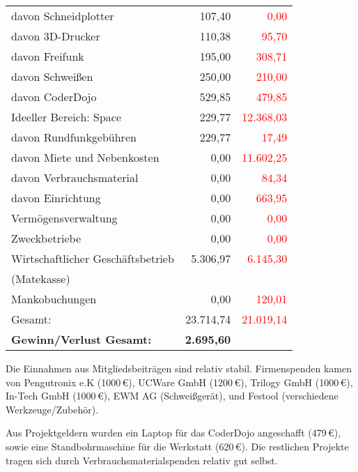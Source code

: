 \documentclass{s0minutes}
\begin{document}
\begin{longtable}{lr>{\textcolor{red}\bgroup}r<{\egroup}}
  \quad davon Schneidplotter        &      107{,}40 &         0{,}00 \\
  \quad davon 3D-Drucker            &      110{,}38 &        95{,}70 \\
  \quad davon Freifunk              &      195{,}00 &       308{,}71 \\
  \quad davon Schweißen             &      250{,}00 &       210{,}00 \\
  \quad davon CoderDojo             &      529{,}85 &       479{,}85 \\
  \midrule
  Ideeller Bereich: Space           &      229{,}77 &  12{.}368{,}03 \\
  \quad davon Rundfunkgebühren      &      229{,}77 &        17{,}49 \\
  \quad davon Miete und Nebenkosten &        0{,}00 &  11{.}602{,}25 \\
  \quad davon Verbrauchsmaterial    &        0{,}00 &        84{,}34 \\
  \quad davon Einrichtung           &        0{,}00 &       663{,}95 \\
  \midrule
  Vermögensverwaltung               &        0{,}00 &         0{,}00 \\
  \midrule
  Zweckbetriebe                     &        0{,}00 &         0{,}00 \\
  \midrule
  Wirtschaftlicher Geschäftsbetrieb &  5{.}306{,}97 &   6{.}145{,}30 \\
  \quad (Matekasse) && \\
  \midrule
  Mankobuchungen                    &        0{,}00 &       120{,}01 \\
  \midrule\midrule
  Gesamt:                           & 23{.}714{,}74 &  21{.}019{,}14 \\

  \textbf{Gewinn/Verlust Gesamt:} & \textbf{2{.}695{,}60} &          \\
\end{longtable}

Die Einnahmen aus Mitgliedsbeiträgen sind relativ stabil.
Firmenspenden kamen von Pengutronix e.K (1000\,€), UCWare GmbH (1200\,€),
Trilogy GmbH (1000\,€), In-Tech GmbH (1000\,€), EWM AG (Schweißgerät), und 
Festool (verschiedene Werkzeuge/Zubehör).

Aus Projektgeldern wurden ein Laptop für das CoderDojo angeschafft (479\,€),
sowie eine Standbohrmaschine für die Werkstatt (620\,€). Die restlichen Projekte
tragen sich durch Verbrauchsmaterialspenden relativ gut selbst.
\end{document}
